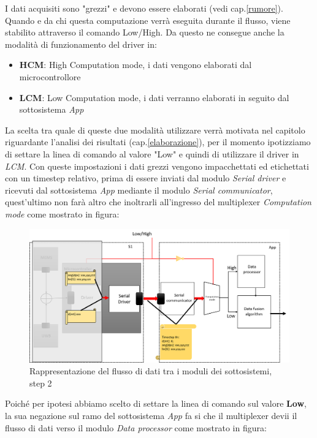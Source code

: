 I dati acquisiti sono "grezzi" e devono essere elaborati (vedi cap.\ref{rumore}). Quando e da chi questa computazione verrà eseguita durante il flusso, viene stabilito attraverso il comando Low/High. Da questo ne consegue anche la modalità di funzionamento del driver in:
\begin{itemize}
	\item \textbf{HCM}: High Computation mode, i dati vengono elaborati dal microcontrollore
	\item \textbf{LCM}: Low Computation mode, i dati verranno elaborati in seguito dal sottosistema \textit{App} 
\end{itemize}
La scelta tra quale di queste due modalità utilizzare verrà motivata nel capitolo riguardante l'analisi dei risultati (cap.\ref{elaborazione}), per il momento ipotizziamo di settare la linea di comando al valore "Low" e quindi di utilizzare il driver in \textit{LCM}. Con queste impostazioni i dati grezzi vengono impacchettati ed etichettati con un timestep relativo, prima di essere inviati dal modulo \textit{Serial driver} e ricevuti dal sottosistema \textit{App} mediante il modulo \textit{Serial communicator}, quest'ultimo non farà altro che inoltrarli all'ingresso del multiplexer \textit{Computation mode} come mostrato in figura:
\begin{figure}[H]  
	\centering 
	\includegraphics[scale=0.25 ]{DescrizioneDelSistema/flusso2.png}
	\caption{Rappresentazione del flusso di dati tra i moduli dei sottosistemi, step 2}
	\label{fig:flusso2}
\end{figure}
Poiché per ipotesi abbiamo scelto di settare la linea di comando sul valore \textbf{Low}, la sua negazione sul ramo del sottosistema \textit{App} fa si che il multiplexer devii il flusso di dati verso il modulo \textit{Data processor} come mostrato in figura:

